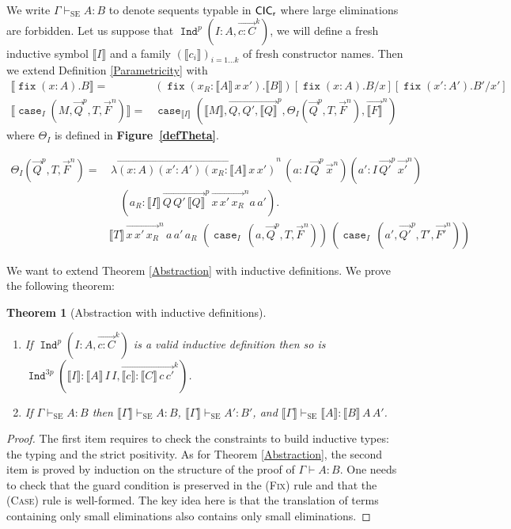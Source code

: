 \documentclass[a4paper,USenglish]{lipics}
\newtheorem{thm}{Theorem}
\DeclareMathOperator{\Ind}{\mathtt{Ind}}
\DeclareMathOperator{\case}{\mathtt{case}}
\DeclareMathOperator{\fix}{\mathtt{fix}}
\def\cicr{$\text{\textsf{CIC}}_{\text{\textsf{r}}}$\xspace}
\newcommand{\rel}[3]{{⟦#1⟧}\,{#2}\,{#3}}
\newcommand{\arrlong}[1]{\overrightarrow{#1}}
\newcommand{\we}{⊢_{\mathop{\text{SE}}}}
\newcommand\arn[2]{
{\arrlong{#1}}^{#2}
}
\begin{document}
We write $Γ \we A : B$ to denote sequents typable in \cicr where large
eliminations are forbidden. Let us suppose that $\Ind^p(I:A, \arn{c :
  C}{k})$, we will define a fresh inductive symbol $⟦I⟧$ and a
family $(⟦c_i⟧)_{i=1...k}$ of fresh constructor names. Then we extend
\textsf{Definition \ref{Parametricity}} with
 \begin{align*}
   ⟦\fix(x:A).B⟧ = & \left(\fix(x_R:⟦A⟧\,x\,x').⟦B⟧\right) [\fix(x:A).B/x][\fix(x':A').B'/x']\\
   ⟦\case_I(M,\arn{Q}{p}, T,\arn{F}{n})⟧ = & \case_{⟦I⟧}(⟦M⟧,\arn{Q, Q',
     ⟦Q⟧}{p}, Θ_I(\arn{Q}{p},T,\arn{F}{n}),\arn{⟦F⟧}{n})
\end{align*}
where $Θ_I$ is defined in \textsf{\textbf{\small Figure~\ref{defTheta}}}.

\begin{figure*}
\begin{align*}
  Θ_I(\arn{Q}{p},T,\arn{F}{n}) = &\,λ\arn{(x:A)(x':A')(x_R:⟦A⟧\,x\,x')}{n}\,(a : I\,\arn{Q}{p}\,\arn{x}{n})
                 (a': I\,\arn{Q'}{p}\,\arn{x'}{n})\\
& \quad (a_R : ⟦I⟧\,\arn{Q\,Q'\,⟦Q⟧}{p}\,\arn{x\,x'\,x_R}{n} a\,a').\\
      & ⟦T⟧\,\arn{x\,x'\,x_R}{n}\,a\,a'\,a_R\,
                           \,(\case_I\,(a, \arn{Q}{p}, T, \arn{F}{n}))
                           \,(\case_{I}\,(a', \arn{Q'}{p}, T', \arn{F'}{n}))
\end{align*}
\caption{\label{defTheta} The definition of $Θ_I$}
\end{figure*}

We want to extend \textsf{Theorem \ref{Abstraction}}
with inductive definitions. We prove the following theorem:

\begin{thm}[\label{AbstractionInductive}Abstraction with inductive definitions]
 \begin{enumerate}
  \item  If $\Ind^p(I:A, \arn{c : C}{k})$ is a valid inductive definition
       then so is $\Ind^{3p}(⟦I⟧ : ⟦A⟧\,I\,I, \arn{⟦c⟧ : ⟦C⟧\,c\,c'}{k})$.
  \item If $Γ \we A : B$ then $⟦Γ⟧ \we A : B$, $⟦Γ⟧ \we A' : B'$, and
      $⟦Γ⟧ \we ⟦A⟧ : \rel{B}{A}{A'}$.
 \end{enumerate}
\end{thm}

\begin{proof}
  The first item requires
  to check the constraints to build inductive types: the typing and the
  strict positivity. As for \textsf{Theorem \ref{Abstraction}}, the second item
  is proved by induction on the structure of the proof of $\Gamma \vdash
  A : B$. One needs to check that the guard condition is preserved in
  the (\textsc{Fix}) rule and that the (\textsc{Case}) rule is
  well-formed. The key idea here is that the translation of terms
  containing only small eliminations also contains only small
  eliminations.
\end{proof}
\end{document}
